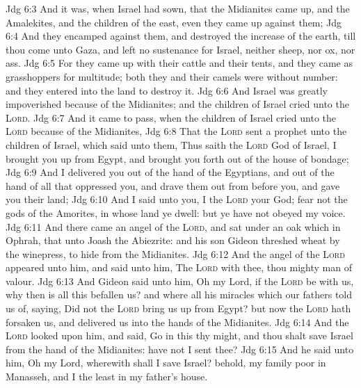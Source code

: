 \vs Jdg 6:3 And  it was, when Israel had sown, that the Midianites came up, and the Amalekites, and the children of the east, even they came up against them;
\vs Jdg 6:4 And they encamped against them, and destroyed the increase of the earth, till thou come unto Gaza, and left no sustenance for Israel, neither sheep, nor ox, nor ass.
\vs Jdg 6:5 For they came up with their cattle and their tents, and they came as grasshoppers for multitude;  both they and their camels were without number: and they entered into the land to destroy it.
\vs Jdg 6:6 And Israel was greatly impoverished because of the Midianites; and the children of Israel cried unto the \textsc{Lord}.
\vs Jdg 6:7 And it came to pass, when the children of Israel cried unto the \textsc{Lord} because of the Midianites,
\vs Jdg 6:8 That the \textsc{Lord} sent a prophet unto the children of Israel, which said unto them, Thus saith the \textsc{Lord} God of Israel, I brought you up from Egypt, and brought you forth out of the house of bondage;
\vs Jdg 6:9 And I delivered you out of the hand of the Egyptians, and out of the hand of all that oppressed you, and drave them out from before you, and gave you their land;
\vs Jdg 6:10 And I said unto you, I  the \textsc{Lord} your God; fear not the gods of the Amorites, in whose land ye dwell: but ye have not obeyed my voice.
\vs Jdg 6:11 And there came an angel of the \textsc{Lord}, and sat under an oak which  in Ophrah, that  unto Joash the Abiezrite: and his son Gideon threshed wheat by the winepress, to hide  from the Midianites.
\vs Jdg 6:12 And the angel of the \textsc{Lord} appeared unto him, and said unto him, The \textsc{Lord}  with thee, thou mighty man of valour.
\vs Jdg 6:13 And Gideon said unto him, Oh my Lord, if the \textsc{Lord} be with us, why then is all this befallen us? and where  all his miracles which our fathers told us of, saying, Did not the \textsc{Lord} bring us up from Egypt? but now the \textsc{Lord} hath forsaken us, and delivered us into the hands of the Midianites.
\vs Jdg 6:14 And the \textsc{Lord} looked upon him, and said, Go in this thy might, and thou shalt save Israel from the hand of the Midianites: have not I sent thee?
\vs Jdg 6:15 And he said unto him, Oh my Lord, wherewith shall I save Israel? behold, my family  poor in Manasseh, and I  the least in my father's house.
